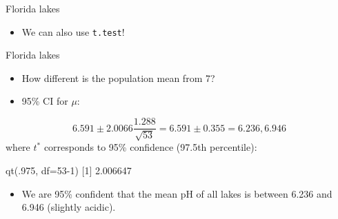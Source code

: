 \documentclass[
  10pt,
  ignorenonframetext,
]{beamer}
\newenvironment{Shaded}{\begin{snugshade}}{\end{snugshade}}
\newcommand{\AttributeTok}[1]{\textcolor[rgb]{0.77,0.63,0.00}{#1}}
\newcommand{\DecValTok}[1]{\textcolor[rgb]{0.00,0.00,0.81}{#1}}
\newcommand{\FloatTok}[1]{\textcolor[rgb]{0.00,0.00,0.81}{#1}}
\newcommand{\FunctionTok}[1]{\textcolor[rgb]{0.00,0.00,0.00}{#1}}
\newcommand{\NormalTok}[1]{#1}
\newcommand{\OtherTok}[1]{\textcolor[rgb]{0.56,0.35,0.01}{#1}}
\newcommand{\SpecialCharTok}[1]{\textcolor[rgb]{0.00,0.00,0.00}{#1}}
\providecommand{\tightlist}{%
  \setlength{\itemsep}{0pt}\setlength{\parskip}{0pt}}
\let\oldShaded\Shaded
\let\endoldShaded\endShaded
\renewenvironment{Shaded}{\tiny\oldShaded}{\endoldShaded}
\begin{document}
\begin{frame}[fragile]{Florida lakes}
\protect\hypertarget{florida-lakes-4}{}
\begin{itemize}
\tightlist
\item
  We can also use \texttt{t.test}!
\end{itemize}

\begin{Shaded}
\end{Shaded}
\end{frame}

\begin{frame}[fragile]{Florida lakes}
\protect\hypertarget{florida-lakes-5}{}
\begin{itemize}
\item
  How different is the population mean from 7?
\item
  95\% CI for \(\mu\):
\end{itemize}

\[
6.591 \pm 2.0066 \dfrac{1.288}{\sqrt{53}} = 6.591 \pm 0.355 = 6.236, 6.946
\] where \(t^*\) corresponds to 95\% confidence (97.5th percentile):

\begin{Shaded}
\begin{Highlighting}[]
\FunctionTok{qt}\NormalTok{(.}\DecValTok{975}\NormalTok{, }\AttributeTok{df=}\DecValTok{53{-}1}\NormalTok{)}
\NormalTok{[}\DecValTok{1}\NormalTok{] }\FloatTok{2.006647}
\end{Highlighting}
\end{Shaded}

\begin{itemize}
\tightlist
\item
  We are 95\% confident that the mean pH of all lakes is between 6.236
  and 6.946 (slightly acidic).
\end{itemize}
\end{frame}
\end{document}

